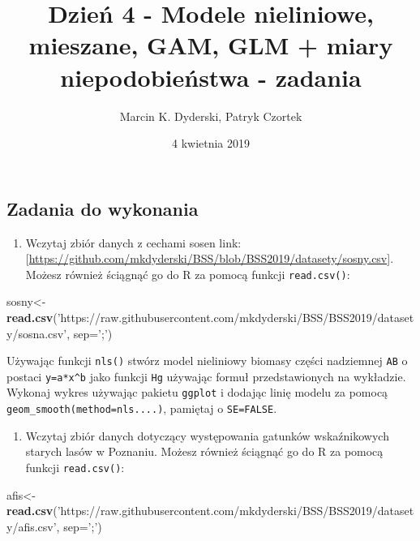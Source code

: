 \documentclass[]{article}
\title{Dzień 4 - Modele nieliniowe, mieszane, GAM, GLM + miary niepodobieństwa
- zadania}
\author{Marcin K. Dyderski, Patryk Czortek}
\date{4 kwietnia 2019}
\newenvironment{Shaded}{\begin{snugshade}}{\end{snugshade}}
\newcommand{\KeywordTok}[1]{\textcolor[rgb]{0.13,0.29,0.53}{\textbf{#1}}}
\newcommand{\DataTypeTok}[1]{\textcolor[rgb]{0.13,0.29,0.53}{#1}}
\newcommand{\StringTok}[1]{\textcolor[rgb]{0.31,0.60,0.02}{#1}}
\newcommand{\NormalTok}[1]{#1}
\providecommand{\tightlist}{%
  \setlength{\itemsep}{0pt}\setlength{\parskip}{0pt}}
\begin{document}
\maketitle

\subsection{Zadania do wykonania}\label{zadania-do-wykonania}

\begin{enumerate}
\def\labelenumi{\arabic{enumi}.}
\tightlist
\item
  Wczytaj zbiór danych z cechami sosen link:
  {[}\url{https://github.com/mkdyderski/BSS/blob/BSS2019/datasety/sosny.csv}{]}.
  Możesz również ściągnąć go do R za pomocą funkcji \texttt{read.csv()}:
\end{enumerate}

\begin{Shaded}
\begin{Highlighting}[]
\NormalTok{sosny<-}\KeywordTok{read.csv}\NormalTok{(}\StringTok{'https://raw.githubusercontent.com/mkdyderski/BSS/BSS2019/datasety/sosna.csv'}\NormalTok{,}
                \DataTypeTok{sep=}\StringTok{';'}\NormalTok{)}
\end{Highlighting}
\end{Shaded}

Używając funkcji \texttt{nls()} stwórz model nieliniowy biomasy części
nadziemnej \texttt{AB} o postaci \texttt{y=a*x\^{}b} jako funkcji
\texttt{Hg} używając formuł przedstawionych na wykładzie. Wykonaj wykres
używając pakietu \texttt{ggplot} i dodając linię modelu za pomocą
\texttt{geom\_smooth(method=\textquotesingle{}nls\textquotesingle{}....)},
pamiętaj o \texttt{SE=FALSE}.

\begin{enumerate}
\def\labelenumi{\arabic{enumi}.}
\setcounter{enumi}{1}
\tightlist
\item
  Wczytaj zbiór danych dotyczący występowania gatunków wskaźnikowych
  starych lasów w Poznaniu. Możesz również ściągnąć go do R za pomocą
  funkcji \texttt{read.csv()}:
\end{enumerate}

\begin{Shaded}
\begin{Highlighting}[]
\NormalTok{afis<-}\KeywordTok{read.csv}\NormalTok{(}\StringTok{'https://raw.githubusercontent.com/mkdyderski/BSS/BSS2019/datasety/afis.csv'}\NormalTok{,}
               \DataTypeTok{sep=}\StringTok{';'}\NormalTok{)}
\end{Highlighting}
\end{Shaded}
\end{document}
